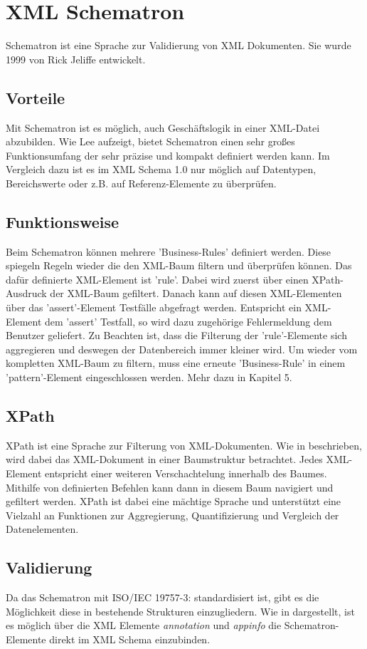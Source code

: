 \chapter{XML Schematron}
\label{cha:Schematron}
Schematron ist eine Sprache zur Validierung von XML Dokumenten. Sie wurde 1999 von Rick Jeliffe entwickelt.

\section{Vorteile}
Mit Schematron ist es möglich, auch Geschäftslogik in einer XML-Datei abzubilden. Wie Lee \cite{Lee2000ComparativeAO} aufzeigt, bietet Schematron einen sehr großes Funktionsumfang der sehr präzise und kompakt definiert werden kann.
Im Vergleich dazu ist es im XML Schema 1.0 nur möglich auf Datentypen, Bereichswerte oder z.B. auf Referenz-Elemente zu überprüfen.

\section{Funktionsweise}
Beim Schematron können mehrere 'Business-Rules' definiert werden. Diese spiegeln Regeln wieder die den XML-Baum filtern und überprüfen können. Das dafür definierte XML-Element ist 'rule'. Dabei wird zuerst über einen XPath-Ausdruck der XML-Baum gefiltert. Danach kann auf diesen XML-Elementen über das 'assert'-Element Testfälle abgefragt werden. Entspricht ein XML-Element dem 'assert' Testfall, so wird dazu zugehörige Fehlermeldung dem Benutzer geliefert.
Zu Beachten ist, dass die Filterung der 'rule'-Elemente sich aggregieren und deswegen der Datenbereich immer kleiner wird.
Um wieder vom kompletten XML-Baum zu filtern, muss eine erneute 'Business-Rule' in einem 'pattern'-Element eingeschlossen werden. Mehr dazu in \cite{Montero2011} Kapitel 5.


\section{XPath}
\label{sec:XPath}
XPath ist eine Sprache zur Filterung von XML-Dokumenten. Wie in \cite{Kay2011} beschrieben, wird dabei das XML-Dokument in einer Baumstruktur betrachtet. Jedes XML-Element entspricht einer weiteren Verschachtelung innerhalb des Baumes. Mithilfe von definierten Befehlen kann dann in diesem Baum navigiert und gefiltert werden. XPath ist dabei eine mächtige Sprache und unterstützt eine Vielzahl an Funktionen zur Aggregierung, Quantifizierung und Vergleich der Datenelementen. 


\section{Validierung}
Da das Schematron mit ISO/IEC 19757-3: \cite{ISO_IEC19757} standardisiert ist, gibt es die Möglichkeit diese in bestehende Strukturen einzugliedern. Wie in \cite{Akhilesh_validatinga} dargestellt, ist es möglich über die XML Elemente \emph{annotation} und \emph{appinfo} die Schematron-Elemente direkt im XML Schema einzubinden.
